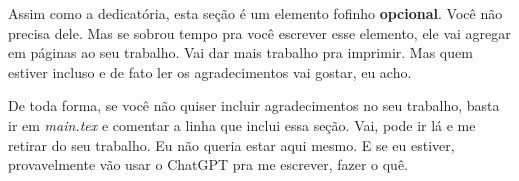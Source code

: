 \begin{agradecimentos}
Assim como a dedicatória, esta seção é um elemento fofinho \textbf{opcional}. Você não precisa dele. Mas se sobrou tempo pra você escrever esse elemento, ele vai agregar em páginas ao seu trabalho. Vai dar mais trabalho pra imprimir. Mas quem estiver incluso e de fato ler os agradecimentos vai gostar, eu acho.

De toda forma, se você não quiser incluir agradecimentos no seu trabalho, basta ir em \textit{main.tex} e comentar a linha que inclui essa seção. Vai, pode ir lá e me retirar do seu trabalho. Eu não queria estar aqui mesmo. E se eu estiver, provavelmente vão usar o ChatGPT pra me escrever, fazer o quê.
 
\end{agradecimentos}
